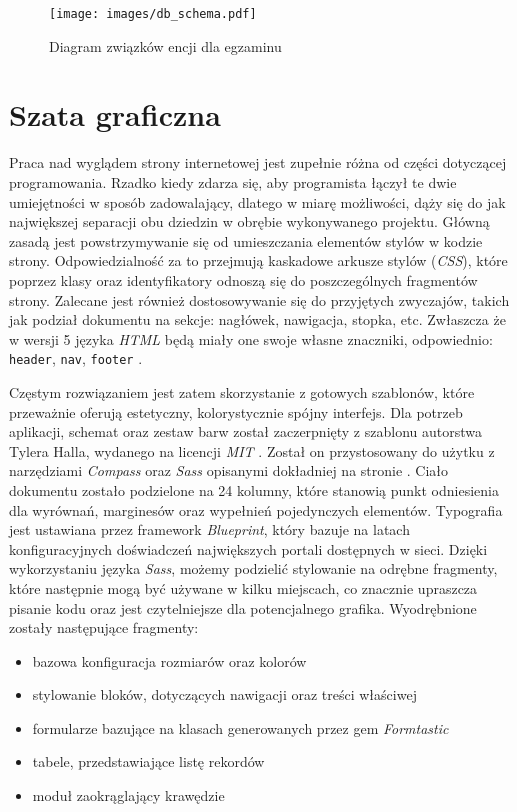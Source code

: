 \documentclass[12pt,twoside]{report}
\begin{document}
\begin{figure}[ht]
  \begin{center}
    \texttt{[image: images/db\_schema.pdf]}
  \end{center}
  \caption{Diagram związków encji dla egzaminu}
  \label{fig:db_schema}
\end{figure}

\section{Szata graficzna}
Praca nad wyglądem strony internetowej jest zupełnie różna od części dotyczącej
programowania. Rzadko kiedy zdarza się, aby programista łączył te dwie umiejętności w
sposób zadowalający, dlatego w miarę możliwości, dąży się do jak największej separacji obu
dziedzin w obrębie wykonywanego projektu. Główną zasadą jest powstrzymywanie się od
umieszczania elementów stylów w kodzie strony. Odpowiedzialność za to przejmują kaskadowe
arkusze stylów (\emph{CSS}), które poprzez klasy oraz identyfikatory odnoszą się do
poszczególnych fragmentów strony. Zalecane jest również dostosowywanie się do przyjętych
zwyczajów, takich jak podział dokumentu na sekcje: nagłówek, nawigacja, stopka, etc.
Zwłaszcza że w wersji 5 języka \emph{HTML} będą miały one swoje własne znaczniki,
odpowiednio: \texttt{header}, \texttt{nav}, \texttt{footer} \cite{html5}.


Częstym rozwiązaniem jest zatem skorzystanie z gotowych szablonów, które przeważnie oferują
estetyczny, kolorystycznie spójny interfejs. Dla potrzeb aplikacji, schemat oraz zestaw
barw został zaczerpnięty z szablonu autorstwa Tylera Halla, wydanego na licencji
\emph{MIT} \cite{yui-app-theme}. Został on przystosowany do użytku z narzędziami
\emph{Compass} oraz \emph{Sass} opisanymi dokładniej na stronie \pageref{sec:compass}.
Ciało dokumentu zostało podzielone na 24 kolumny, które stanowią punkt odniesienia dla
wyrównań, marginesów oraz wypełnień pojedynczych elementów. Typografia jest ustawiana
przez framework \emph{Blueprint}, który bazuje na latach konfiguracyjnych doświadczeń
największych portali dostępnych w sieci. Dzięki wykorzystaniu języka \emph{Sass}, możemy
podzielić stylowanie na odrębne fragmenty, które następnie mogą być używane w kilku
miejscach, co znacznie upraszcza pisanie kodu oraz jest czytelniejsze dla potencjalnego
grafika. Wyodrębnione zostały następujące fragmenty:

\begin{itemize}
  \item{bazowa konfiguracja rozmiarów oraz kolorów}
  \item{stylowanie bloków, dotyczących nawigacji oraz treści właściwej}
  \item{formularze bazujące na klasach generowanych przez gem \emph{Formtastic}}
  \item{tabele, przedstawiające listę rekordów}
  \item{moduł zaokrąglający krawędzie}
\end{itemize}
\end{document}
